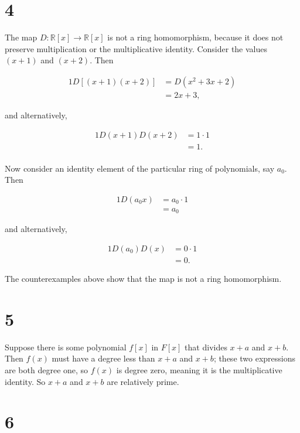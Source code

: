 \documentclass{article}
\begin{document}
\section*{4}

The map $D: \mathbb{R}[x] \rightarrow \mathbb{R}[x]$ is not a ring homomorphism, because 
it does not preserve multiplication or the multiplicative identity.  Consider the values 
$(x + 1)$ and $(x + 2)$.  Then 

\begin{alignat*}{1}
    D[(x+1)(x+2)] &= D(x^2 + 3x + 2) \\ 
    &= 2x + 3,
\end{alignat*}

and alternatively, 

\begin{alignat*}{1}
    D(x+1)D(x+2) &= 1 \cdot 1 \\ 
    &= 1. \\
\end{alignat*}

Now consider an identity element of the particular ring of polynomials, say $a_0$.  
Then 

\begin{alignat*}{1}
    D(a_0x) &= a_0 \cdot 1 \\
    &= a_0
\end{alignat*}

and alternatively, 

\begin{alignat*}{1}
    D(a_0)D(x) &= 0 \cdot 1 \\ 
    &= 0.
\end{alignat*}

The counterexamples above show that the map is not a ring homomorphism.

\section*{5}

Suppose there is some polynomial $f[x]$ in $F[x]$ that divides $x + a$ and $x + b$.  
Then $f(x)$ must have a degree less than $x + a$ and $x + b$; these two expressions are 
both degree one, so $f(x)$ is degree zero, meaning it is the multiplicative identity.  So 
$x + a$ and $x + b$ are relatively prime. 


\section*{6}
\end{document}
